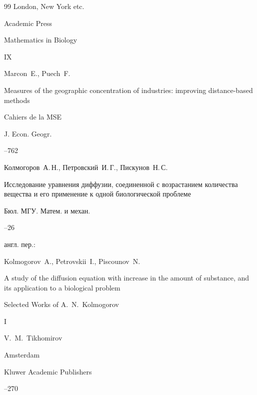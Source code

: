 \begin{thebibliography}{99}
\publaddr London, New York etc.

\publ Academic Press

\serial Mathematics in Biology

\vol IX







\by Marcon~E., Puech~F. 


\paper Measures of the geographic concentration of industries: improving distance-based methods

\publ Cahiers de la MSE 

\jour J. Econ. Geogr.




--762








\by Колмогоров~А.\,Н., Петровский~И.\,Г., Пискунов~Н.\,С.

\paper Исследование уравнения диффузии, соединенной с возрастанием количества вещества и его применение к одной биологической проблеме

\jour Бюл. МГУ. Матем. и механ.




--26

\transl англ. пер.:~

\by Kolmogorov~A., Petrovskii~I., Piscounov~N.

\paper A study of the diffusion equation with increase in the amount of substance, and its application to a biological problem

\inbook Selected Works of A.~N.~Kolmogorov

\bookvol I

\ed V.~M.~Tikhomirov

\publaddr Amsterdam

\publ Kluwer Academic Publishers


--270






\end{thebibliography}
